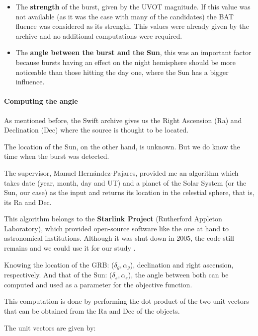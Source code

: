 \begin{itemize}

\item The \textbf{strength} of the burst, given by the UVOT magnitude. If this value was not available (as it was the case with many of the candidates) the BAT fluence was considered as its strength. This values were already given by the archive and no additional computations were required.

\item The \textbf{angle between the burst and the Sun}, this was an important factor because bursts having an effect on the night hemisphere should be more noticeable than those hitting the day one, where the Sun has a bigger influence.

\end{itemize}

\paragraph{Computing the angle}

As mentioned before, the Swift archive gives us the Right Ascension (Ra) and Declination (Dec) where the source is thought to be located.

The location of the Sun, on the other hand, is unknown. But we do know the time when the burst was detected.

The supervisor, Manuel Hernández-Pajares, provided me an algorithm which takes date (year, month, day and UT) and a planet of the Solar System (or the Sun, our case) as the input and returns its location in the celestial sphere, that is, its Ra and Dec. 

This algorithm belongs to the \textbf{Starlink Project} (Rutherford Appleton Laboratory), which provided open-source software like the one at hand to astronomical institutions. Although it was shut down in 2005, the code still remains and we could use it for our study \cite{starlinkproject}.

Knowing the location of the GRB: ($\delta_{g}, \alpha_{g}$), declination and right ascension, respectively. And that of the Sun: ($\delta_{s}, \alpha_{s}$), the angle between both can be computed and used as a parameter for the objective function.

This computation is done by performing the dot product of the two unit vectors that can be obtained from the Ra and Dec of the objects.

The unit vectors are given by: 

